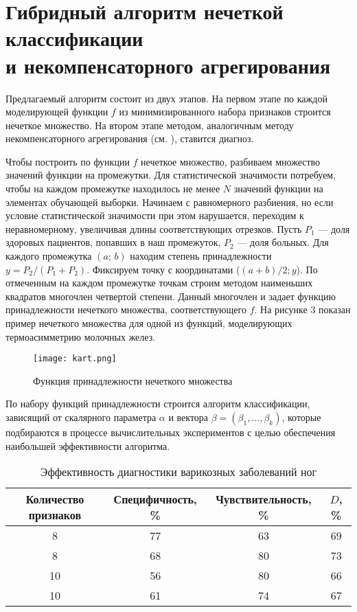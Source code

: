 \section{Гибридный алгоритм нечеткой классификации\\ и некомпенсаторного агрегирования}

Предлагаемый алгоритм состоит из двух этапов. На первом этапе по каждой моделирующей функции $f$ из минимизированного набора признаков строится нечеткое множество. На втором этапе методом, аналогичным методу некомпенсаторного агрегирования (см. \cite{al1}), ставится диагноз.

Чтобы построить по функции $f$ нечеткое множество, разбиваем множество значений функции на промежутки. Для статистической значимости потребуем, чтобы на каждом промежутке находилось не менее $N$ значений функции на элементах обучающей выборки. Начинаем с равномерного разбиения, но если условие статистической значимости при этом нарушается, переходим к неравномерному, увеличивая длины соответствующих отрезков.  Пусть $P_1$ --- доля здоровых пациентов, попавших в наш промежуток,  $P_2$ --- доля больных. Для каждого промежутка $(a;\,b)$ находим степень принадлежности $y = P_2 / (P_1 + P_2)$. Фиксируем точку с координатами ($(a+b)/2$;\,$y$). По отмеченным на каждом промежутке точкам строим методом наименьших квадратов многочлен четвертой степени. Данный многочлен и задает функцию принадлежности нечеткого множества, соответствующего $f$. На рисунке 3 показан пример нечеткого множества для одной из функций, моделирующих термоасимметрию молочных желез.


\begin{figure}[h]
	\centering
	\texttt{[image: kart.png]}
	\caption{Функция принадлежности нечеткого множества}
\end{figure}

По набору функций принадлежности строится алгоритм классификации, зависящий от скалярного параметра $\alpha$ и  вектора $\beta = (\beta_{1},\dots,\beta_{k})$, которые подбираются в процессе вычислительных экспериментов с целью обеспечения наибольшей эффективности алгоритма.

\begin{table}[h]
	\caption{Эффективность диагностики варикозных заболеваний ног}\small
	\centering
	\label{tabluar:tabResults}
	\begin{tabular}{|c|c|c|c|}
		
		\hline
		{Количество признаков} & {Специфичность, \%} & {Чувствительность, \%} &  $D$, \%  \\
		\hline
		8 & 77 & 63 & 69  \\
		\hline
		8 & 68 & 80 & 73 \\
		\hline
		10 & 56 & 80 & 66  \\
		\hline
		10 & 61 & 74 & 67 \\
		\hline
		
		
		
	\end{tabular}
\end{table}

